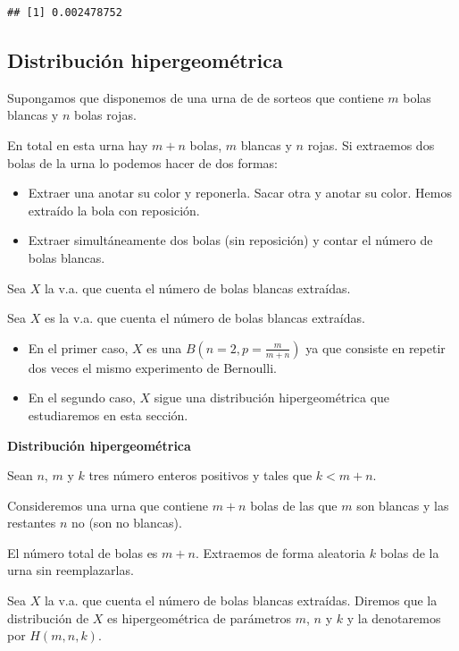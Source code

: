 \documentclass[]{book}
\providecommand{\tightlist}{%
  \setlength{\itemsep}{0pt}\setlength{\parskip}{0pt}}
\begin{document}
\begin{verbatim}
## [1] 0.002478752
\end{verbatim}

\hypertarget{distribuciuxf3n-hipergeomuxe9trica}{%
\subsection{Distribución hipergeométrica}\label{distribuciuxf3n-hipergeomuxe9trica}}

Supongamos que disponemos de una urna de de sorteos que contiene \(m\) bolas blancas y \(n\) bolas rojas.

En total en esta urna hay \(m+n\) bolas, \(m\) blancas y \(n\) rojas. Si extraemos dos bolas de la urna lo podemos hacer de dos formas:

\begin{itemize}
\tightlist
\item
  Extraer una anotar su color y reponerla. Sacar otra y anotar su color. Hemos extraído la bola con reposición.
\item
  Extraer simultáneamente dos bolas (sin reposición) y contar el número de bolas blancas.
\end{itemize}

Sea \(X\) la v.a. que cuenta el número de bolas blancas extraídas.

Sea \(X\) es la v.a. que cuenta el número de bolas blancas extraídas.

\begin{itemize}
\tightlist
\item
  En el primer caso, \(X\) es una \(B(n=2,p=\frac{m}{m+n})\) ya que consiste en repetir dos veces el mismo experimento de Bernoulli.
\item
  En el segundo caso, \(X\) sigue una distribución hipergeométrica que estudiaremos en esta sección.
\end{itemize}

 \textbf{Distribución hipergeométrica}

Sean \(n\), \(m\) y \(k\) tres número enteros positivos y tales que \(k<m+n\).

Consideremos una urna que contiene \(m+n\) bolas de las que \(m\) son blancas y las restantes \(n\) no (son no blancas).

El número total de bolas es \(m+n\). Extraemos de forma aleatoria \(k\) bolas de la urna sin reemplazarlas.

Sea \(X\) la v.a. que cuenta el número de bolas blancas extraídas. Diremos que la distribución de \(X\) es hipergeométrica de parámetros \(m\), \(n\) y \(k\) y la denotaremos por \(H(m,n,k)\).
\end{document}
